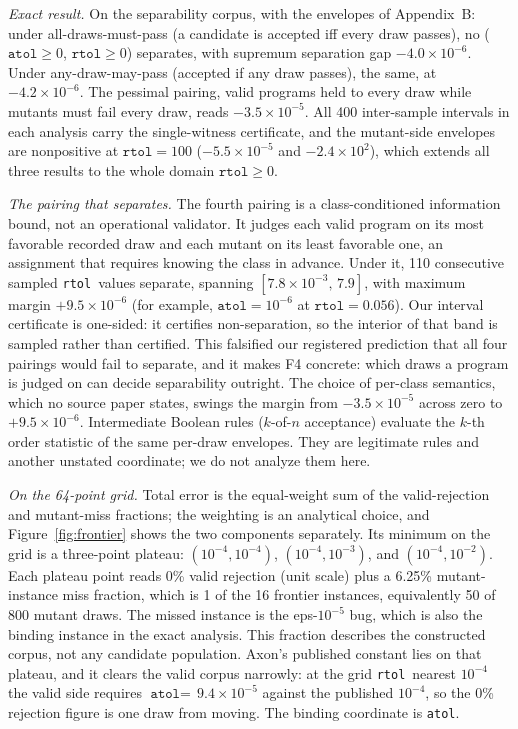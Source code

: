 \documentclass[twocolumn,10pt]{article}
\newcommand{\atol}{\texttt{atol}}
\newcommand{\rtol}{\texttt{rtol}}
\newcommand{\e}[2]{$#1\times10^{#2}$}
\begin{document}
\emph{Exact result.} On the separability corpus, with the envelopes of
Appendix~B: under all-draws-must-pass (a candidate is accepted iff every
draw passes), no ($\atol\ge0$, $\rtol\ge0$) separates, with supremum
separation gap \e{-4.0}{-6}. Under any-draw-may-pass (accepted if any
draw passes), the same, at \e{-4.2}{-6}. The pessimal pairing, valid
programs held to every draw while mutants must fail every draw, reads
\e{-3.5}{-5}. All 400 inter-sample intervals in each analysis carry the
single-witness certificate, and the mutant-side envelopes are
nonpositive at $\rtol=100$ (\e{-5.5}{-5} and \e{-2.4}{2}), which extends
all three results to the whole domain $\rtol\ge0$.

\emph{The pairing that separates.} The fourth pairing is a
class-conditioned information bound, not an operational validator. It
judges each valid program on its most favorable recorded draw and each
mutant on its least favorable one, an assignment that requires knowing
the class in advance. Under it, 110 consecutive sampled \rtol\ values
separate, spanning $[7.8\times10^{-3},\, 7.9]$, with maximum margin
\e{+9.5}{-6} (for example, $\atol=10^{-6}$ at $\rtol=0.056$). Our
interval certificate is one-sided: it certifies non-separation, so the
interior of that band is sampled rather than certified. This falsified
our registered prediction that all four pairings would fail to separate,
and it makes F4 concrete: which draws a program is judged on can decide
separability outright. The choice of per-class semantics, which no
source paper states, swings the margin from \e{-3.5}{-5} across zero to
\e{+9.5}{-6}. Intermediate Boolean rules ($k$-of-$n$ acceptance)
evaluate the $k$-th order statistic of the same per-draw envelopes. They
are legitimate rules and another unstated coordinate; we do not analyze
them here.

\emph{On the 64-point grid.} Total error is the equal-weight sum of the
valid-rejection and mutant-miss fractions; the weighting is an
analytical choice, and Figure~\ref{fig:frontier} shows the two
components separately. Its minimum on the grid is a three-point plateau:
$(10^{-4},10^{-4})$, $(10^{-4},10^{-3})$, and $(10^{-4},10^{-2})$. Each
plateau point reads 0\% valid rejection (unit scale) plus a 6.25\%
mutant-instance miss fraction, which is 1 of the 16 frontier instances,
equivalently 50 of 800 mutant draws. The missed instance is the
eps-$10^{-5}$ bug, which is also the binding instance in the exact
analysis. This fraction describes the constructed corpus, not any
candidate population. Axon's published constant lies on that plateau,
and it clears the valid corpus narrowly: at the grid \rtol\ nearest
$10^{-4}$ the valid side requires $\atol=$\,\e{9.4}{-5} against the
published $10^{-4}$, so the 0\% rejection figure is one draw from
moving. The binding coordinate is \atol.
\end{document}
